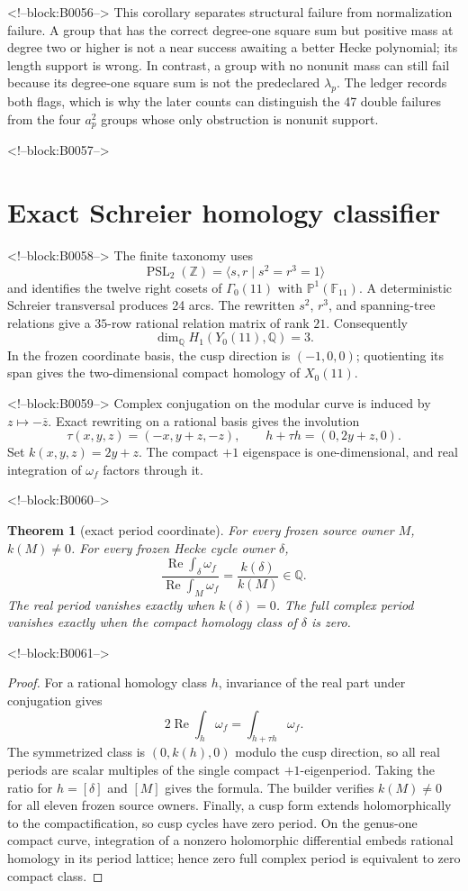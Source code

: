 \documentclass[11pt]{article}
\newtheorem{theorem}{Theorem}[section]
\theoremstyle{definition}
\theoremstyle{remark}
\newcommand{\G}{\Gamma_0(11)}
\newcommand{\QQ}{\mathbb Q}
\begin{document}
<!--block:B0056-->
This corollary separates structural failure from normalization failure. A group that has the correct degree-one square sum but positive mass at degree two or higher is not a near success awaiting a better Hecke polynomial; its length support is wrong. In contrast, a group with no nonunit mass can still fail because its degree-one square sum is not the predeclared $\lambda_p$. The ledger records both flags, which is why the later counts can distinguish the 47 double failures from the four $a_p^2$ groups whose only obstruction is nonunit support.

<!--block:B0057-->
\section{Exact Schreier homology classifier}

<!--block:B0058-->
The finite taxonomy uses
\[
\operatorname{PSL}_2(\mathbb Z)=\langle s,r\mid s^2=r^3=1\rangle
\]
and identifies the twelve right cosets of $\G$ with $\mathbb P^1(\mathbb F_{11})$. A deterministic Schreier transversal produces 24 arcs. The rewritten $s^2$, $r^3$, and spanning-tree relations give a $35$-row rational relation matrix of rank $21$. Consequently
\[
\dim_\QQ H_1(Y_0(11),\QQ)=3.
\]
In the frozen coordinate basis, the cusp direction is $(-1,0,0)$; quotienting its span gives the two-dimensional compact homology of $X_0(11)$.

<!--block:B0059-->
Complex conjugation on the modular curve is induced by $z\mapsto-\overline z$. Exact rewriting on a rational basis gives the involution
\[
\tau(x,y,z)=(-x,y+z,-z),
\qquad
h+\tau h=(0,2y+z,0).
\]
Set $k(x,y,z)=2y+z$. The compact $+1$ eigenspace is one-dimensional, and real integration of $\omega_f$ factors through it.

<!--block:B0060-->
\begin{theorem}[exact period coordinate]\label{thm:k}
For every frozen source owner $M$, $k(M)\neq0$. For every frozen Hecke cycle owner $\delta$,
\[
\frac{\operatorname{Re}\int_\delta\omega_f}
{\operatorname{Re}\int_M\omega_f}
=\frac{k(\delta)}{k(M)}\in\QQ.
\]
The real period vanishes exactly when $k(\delta)=0$. The full complex period vanishes exactly when the compact homology class of $\delta$ is zero.
\end{theorem}

<!--block:B0061-->
\begin{proof}
For a rational homology class $h$, invariance of the real part under conjugation gives
\[
2\operatorname{Re}\int_h\omega_f=\int_{h+\tau h}\omega_f.
\]
The symmetrized class is $(0,k(h),0)$ modulo the cusp direction, so all real periods are scalar multiples of the single compact $+1$-eigenperiod. Taking the ratio for $h=[\delta]$ and $[M]$ gives the formula. The builder verifies $k(M)\neq0$ for all eleven frozen source owners. Finally, a cusp form extends holomorphically to the compactification, so cusp cycles have zero period. On the genus-one compact curve, integration of a nonzero holomorphic differential embeds rational homology in its period lattice; hence zero full complex period is equivalent to zero compact class.
\end{proof}
\end{document}
